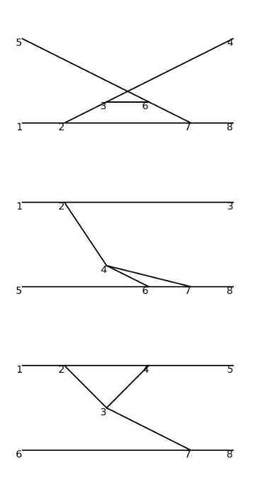 \documentclass[11pt,a4paper,twoside,pdf]{article}
\numberwithin{equation}{section}
\begin{document}
\begin{figure}[h!]
\begin{subfigure}[t]{0.16\textwidth}
    \end{subfigure}
    \hfill
    \begin{subfigure}[t]{0.16\textwidth}
        \centering
        \includegraphics[width=\textwidth]{plots/order4_2to2/4.png}
    \end{subfigure}
    \hfill
    \begin{subfigure}[t]{0.16\textwidth}
        \centering
        \includegraphics[width=\textwidth]{plots/order4_2to2/5.png}
    \end{subfigure}
    \hfill
    \begin{subfigure}[t]{0.16\textwidth}
        \centering
        \includegraphics[width=\textwidth]{plots/order4_2to2/6.png}

\end{subfigure}
\end{figure}
\end{document}
